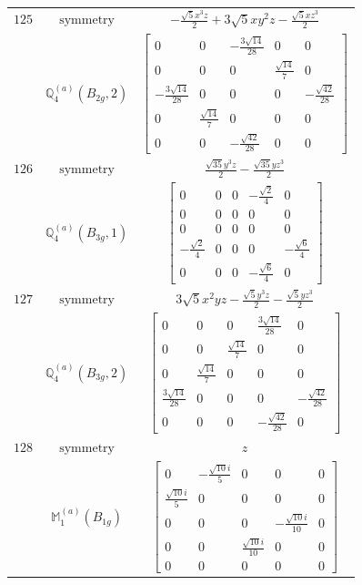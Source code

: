 \documentclass[fleqn,8pt,landscape]{jsarticle}
\begin{document}
\begin{longtable}{ccc}
$ 125 $ & $ \text{symmetry} $ & $ - \frac{\sqrt{5} x^{3} z}{2} + 3 \sqrt{5} x y^{2} z - \frac{\sqrt{5} x z^{3}}{2} $ \\
$  $ & $ \mathbb{Q}_{4}^{(a)}(B_{2g},2) $ & $ \begin{bmatrix} 0 & 0 & - \frac{3 \sqrt{14}}{28} & 0 & 0 \\ 0 & 0 & 0 & \frac{\sqrt{14}}{7} & 0 \\ - \frac{3 \sqrt{14}}{28} & 0 & 0 & 0 & - \frac{\sqrt{42}}{28} \\ 0 & \frac{\sqrt{14}}{7} & 0 & 0 & 0 \\ 0 & 0 & - \frac{\sqrt{42}}{28} & 0 & 0 \end{bmatrix} $ \\ \hline
$ 126 $ & $ \text{symmetry} $ & $ \frac{\sqrt{35} y^{3} z}{2} - \frac{\sqrt{35} y z^{3}}{2} $ \\
$  $ & $ \mathbb{Q}_{4}^{(a)}(B_{3g},1) $ & $ \begin{bmatrix} 0 & 0 & 0 & - \frac{\sqrt{2}}{4} & 0 \\ 0 & 0 & 0 & 0 & 0 \\ 0 & 0 & 0 & 0 & 0 \\ - \frac{\sqrt{2}}{4} & 0 & 0 & 0 & - \frac{\sqrt{6}}{4} \\ 0 & 0 & 0 & - \frac{\sqrt{6}}{4} & 0 \end{bmatrix} $ \\ \hline
$ 127 $ & $ \text{symmetry} $ & $ 3 \sqrt{5} x^{2} y z - \frac{\sqrt{5} y^{3} z}{2} - \frac{\sqrt{5} y z^{3}}{2} $ \\
$  $ & $ \mathbb{Q}_{4}^{(a)}(B_{3g},2) $ & $ \begin{bmatrix} 0 & 0 & 0 & \frac{3 \sqrt{14}}{28} & 0 \\ 0 & 0 & \frac{\sqrt{14}}{7} & 0 & 0 \\ 0 & \frac{\sqrt{14}}{7} & 0 & 0 & 0 \\ \frac{3 \sqrt{14}}{28} & 0 & 0 & 0 & - \frac{\sqrt{42}}{28} \\ 0 & 0 & 0 & - \frac{\sqrt{42}}{28} & 0 \end{bmatrix} $ \\ \hline
$ 128 $ & $ \text{symmetry} $ & $ z $ \\
$  $ & $ \mathbb{M}_{1}^{(a)}(B_{1g}) $ & $ \begin{bmatrix} 0 & - \frac{\sqrt{10} i}{5} & 0 & 0 & 0 \\ \frac{\sqrt{10} i}{5} & 0 & 0 & 0 & 0 \\ 0 & 0 & 0 & - \frac{\sqrt{10} i}{10} & 0 \\ 0 & 0 & \frac{\sqrt{10} i}{10} & 0 & 0 \\ 0 & 0 & 0 & 0 & 0 \end{bmatrix} $ \\ \hline

\end{longtable}
\end{document}
